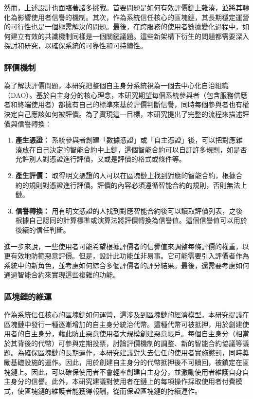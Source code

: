 然而，上述設計也面臨著諸多挑戰。首要問題是如何有效評價鏈上雜湊，並將其轉化為影響使用者信譽的機制。其次，作為系統信任核心的區塊鏈，其長期穩定運營的可行性也是一個極需解決的問題。最後，在跨服務的使用者數據變化過程中，如何建立有效的共識機制同樣是一個關鍵議題。這些新架構下衍生的問題都需要深入探討和研究，以確保系統的可靠性和可持續性。
\subsubsection{評價機制}
為了解決評價問題，本研究把整個自主身分系統視為一個去中心化自治組織（DAO）。基於自主身分的核心理念，本研究期望每個系統參與者（包含服務供應者和終端使用者）都擁有自己的標準來基於評價判斷信譽，同時每個參與者也有權決定自己應該如何被評價。為了實現這一目標，本研究提出了完整的流程來描述評價與信譽轉換：
\begin{enumerate}
  \item \textbf{產生憑證：} 系統參與者創建「數據憑證」或「自主憑證」後，可以把對應雜湊放在自己決定的智能合約中上鏈，這個智能合約可以自訂許多規則，如是否允許別人對憑證進行評價，又或是評價的格式或條件等。
  \item \textbf{產生評價：} 取得明文憑證的人可以在區塊鏈上找到對應的智能合約，根據合約的規則對憑證進行評價。評價的內容必須遵循智能合約的規則，否則無法上鏈。
  \item \textbf{信譽轉換：} 用有明文憑證的人找到對應智能合約後可以讀取評價列表，之後根據自己認同的計算標準或演算法將評價轉換為信譽值。這個信譽值可以用於後續的信任判斷。
\end{enumerate}
進一步來說，一些使用者可能希望根據評價者的信譽值來調整每條評價的權重，以更有效地防範惡意評價。但是，設計此功能並非易事。它可能需要引入評價者作為系統中的新角色，並考慮如何綜合多個評價者的評分結果\cite{josang2006exploring}。最後，還需要考慮如何通過智能合約來實現這些複雜的功能。
\subsubsection{區塊鏈的維運}
作為系統信任核心的區塊鏈如何運營，這涉及到區塊鏈的經濟模型。本研究提議在區塊鏈中發行一種逐漸增加的自主身分統治代幣。這種代幣可被抵押，用於創建使用者的自主身分，藉此防止惡意使用者大規模創建惡意帳戶。每個自主身分（相當於其背後的代幣）可參與定期投票，討論評價機制的調整、新的智能合約協議等議題。為確保區塊鏈的長期運作，本研究建議對失去信任的使用者實施懲罰，同時獎勵基礎設施的運作。因此，用於創建自主身分的代幣抵押後不可贖回，被鎖定在區塊鏈上。因此，可以確保使用者不會輕率創建自主身分，並激勵使用者維護自身自主身分的信譽。此外，本研究建議對使用者在鏈上的每項操作採取使用者付費模式，使區塊鏈的維護者能獲得報酬，從而保證區塊鏈的持續運作。

